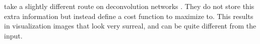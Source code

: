 
  \citeauthor{mahendran_understanding_2015} take a slightly different route on
  deconvolution networks \cite{mahendran_understanding_2015}. They do not
  store this extra information but instead define a cost function to maximize
  to. This results in visualization images that look very surreal, and can be
  quite different from the input.
